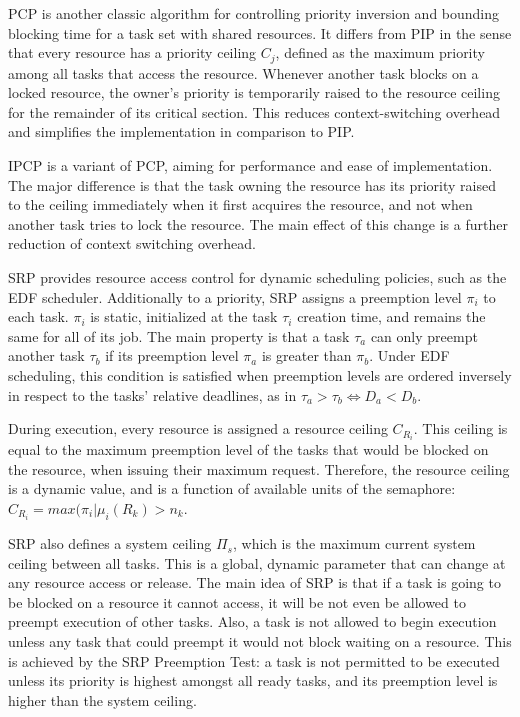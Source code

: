 PCP is another classic algorithm for controlling priority inversion and 
bounding blocking time for a task set with shared resources. It differs from 
PIP in the sense that every resource has a priority ceiling $C_j$, defined as 
the maximum priority among all tasks that access the resource. Whenever another 
task blocks on a locked resource, the owner's priority is temporarily raised to
the resource ceiling for the remainder of its critical section. This reduces 
context-switching overhead and simplifies the implementation in comparison to 
PIP.

IPCP is a variant of PCP, aiming for performance and ease of implementation. 
The major difference is that the task owning the resource has its priority 
raised to the ceiling immediately when it first acquires the resource, and not 
when another task tries to lock the resource. The main effect of this change is 
a further reduction of context switching overhead.

SRP provides resource access control for dynamic scheduling policies, such 
as the EDF scheduler. Additionally to a priority, SRP 
assigns a preemption level $\pi_i$ to each task. $\pi_i$ is static, initialized 
at the task $\tau_i$ creation time, and remains the same for all of its job. 
The main property is that a task $\tau_a$ can only preempt another task 
$\tau_b$ if its preemption level $\pi_a$ is greater than $\pi_b$. Under EDF 
scheduling, this condition is satisfied when preemption levels are ordered 
inversely in respect to the tasks' relative deadlines, as in $\tau_a > \tau_b 
\Longleftrightarrow D_a < D_b$.

During execution, every resource is assigned a resource ceiling $C_{R_i}$. This 
ceiling is equal to the maximum preemption level of the tasks that would be 
blocked on the resource, when issuing their maximum request. Therefore, the 
resource ceiling is a dynamic value, and is a function of available units
of the semaphore: $C_{R_i} = max(\pi_i|\mu_i(R_k) > n_k$.

SRP also defines a system ceiling $\Pi_s$, which is the maximum current system 
ceiling between all tasks. This is a global, dynamic parameter that can change 
at any resource access or release. The main idea of SRP is that if a task is 
going to be blocked on a resource it cannot access, it will be not even be 
allowed to preempt execution of other tasks. Also, a task is not allowed to 
begin execution unless any task that could preempt it would not block waiting 
on a resource. This is achieved by the SRP Preemption Test: a task is not 
permitted to be executed unless its priority is highest amongst all ready tasks, 
and its preemption level is higher than the system ceiling.
